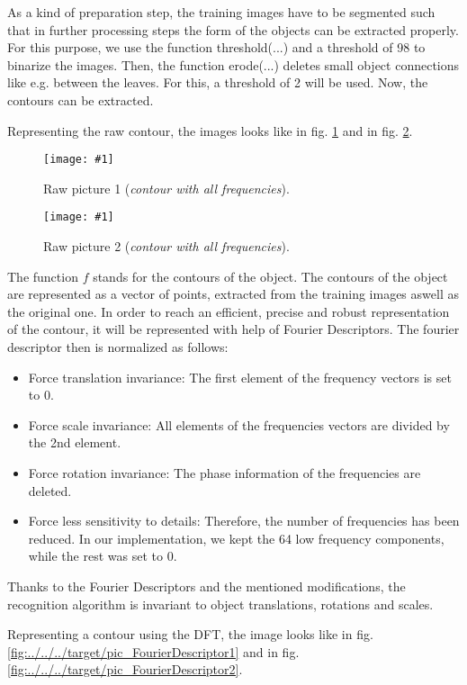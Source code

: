 \documentclass[a4paper,headings=small]{scrartcl}
\numberwithin{equation}{section} %
\numberwithin{figure}{section}   %
\newcommand{\image}[3]{
	\begin{figure}[htbp]
		\centering
		\texttt{[image: \#1]}
		\caption{#3}
		\label{fig:#1}
	\end{figure}
}
\newcommand{\iBinThreshold}{98}
\newcommand{\iNumOfErosions}{2}
\newcommand{\iFDNormDimensions}{64} %
\begin{document}
As a kind of preparation step, the training images have to be segmented such that in 
further processing steps the form of the objects can be extracted properly.
For this purpose, we use the function threshold(...) and a threshold of \iBinThreshold{} to binarize the images.
Then, the function erode(...) deletes small object connections like e.g. between the leaves.
For this, a threshold of \iNumOfErosions{} will be used.
Now, the contours can be extracted.

Representing the raw contour, the images looks like in fig. \ref{fig:../../../target/pic_RawFourierDescriptor1} 
and in fig. \ref{fig:../../../target/pic_RawFourierDescriptor2}.

\image{../../../target/pic_RawFourierDescriptor1}{0.2}{%
		Raw picture 1 (\emph{contour with all frequencies}).}
\image{../../../target/pic_RawFourierDescriptor2}{0.5}{%
		Raw picture 2 (\emph{contour with all frequencies}).}


The function $f$ stands for the contours of the object.
The contours of the object are represented as a vector of points, extracted from the training
images aswell as the original one. In order to reach an efficient, precise and robust representation of the contour, 
it will be represented with help of Fourier Descriptors. The fourier descriptor then is normalized as follows:

\begin{itemize}
\item Force translation invariance: The first element of the frequency vectors is set to 0.
\item Force scale invariance:  All elements of the frequencies vectors are divided by the 2nd element.
\item Force rotation invariance: The phase information of the frequencies are deleted.
\item Force less sensitivity to details: Therefore, the number of frequencies has been reduced.
In our implementation, we kept the \iFDNormDimensions{} low frequency components, while the rest was set to 0.
\end{itemize}

Thanks to the Fourier Descriptors and the mentioned modifications, 
the recognition algorithm is invariant to object translations,
rotations and scales.

Representing a contour using the DFT, the image looks like in fig. \ref{fig:../../../target/pic_FourierDescriptor1} 
and in fig. \ref{fig:../../../target/pic_FourierDescriptor2}.
\end{document}
